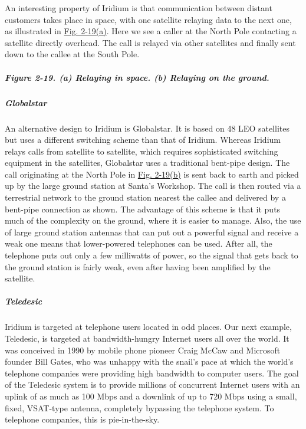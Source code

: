 \documentclass[b5paper,11pt]{memoir}
\begin{document}
An interesting property of Iridium is that communication between distant
customers takes place in space, with one satellite relaying data to the
next one, as illustrated in
\protect\hyperlink{0130661023_ch02lev1sec4.htmlux5cux23ch02fig19}{Fig.
2-19(a)}. Here we see a caller at the North Pole contacting a satellite
directly overhead. The call is relayed via other satellites and finally
sent down to the callee at the South Pole.

\subparagraph[Figure 2-19. (a) Relaying in space. (b) Relaying on the
ground.]{\texorpdfstring{\protect\hypertarget{0130661023_ch02lev1sec4.htmlux5cux23ch02fig19}{}{}Figure
2-19. (a) Relaying in space. (b) Relaying on the
ground.}{Figure 2-19. (a) Relaying in space. (b) Relaying on the ground.}}


\protect\hypertarget{0130661023_ch02lev1sec4.htmlux5cux23ch02lev3sec7}{}{}

\subparagraph{Globalstar}

An alternative design to Iridium is Globalstar. It is based on 48 LEO
satellites but uses a different switching scheme than that of Iridium.
Whereas Iridium relays calls from satellite to satellite, which requires
sophisticated switching equipment in the satellites, Globalstar uses a
traditional bent-pipe design. The call originating at the North Pole in
\protect\hyperlink{0130661023_ch02lev1sec4.htmlux5cux23ch02fig19}{Fig.
2-19(b)} is sent back to earth and picked up by the large ground station
at Santa's Workshop. The call is then routed via a terrestrial network
to the ground station nearest the callee and delivered by a bent-pipe
connection as shown. The advantage of this scheme is that it puts much
of the complexity on the ground, where it is easier to manage. Also, the
use of large ground station antennas that can put out a powerful signal
and receive a weak one means that lower-powered telephones can be used.
After all, the telephone puts out only a few milliwatts of power, so the
signal that gets back to the ground station is fairly weak, even after
having been amplified by the satellite.

\protect\hypertarget{0130661023_ch02lev1sec4.htmlux5cux23ch02lev3sec8}{}{}

\subparagraph{Teledesic}

Iridium is targeted at telephone users located in odd places. Our next
example, {Teledesic}, is targeted at bandwidth-hungry Internet users all
over the world. It was conceived in 1990 by mobile phone pioneer Craig
McCaw and Microsoft founder Bill Gates, who was unhappy with the snail's
pace at which the world's telephone companies were providing high
bandwidth to computer users. The goal of the Teledesic system is to
provide millions of concurrent Internet users with an uplink of as much
as 100 Mbps and a downlink of up to 720 Mbps using a small, fixed,
VSAT-type antenna, completely bypassing the telephone system. To
telephone companies, this is pie-in-the-sky.
\end{document}
